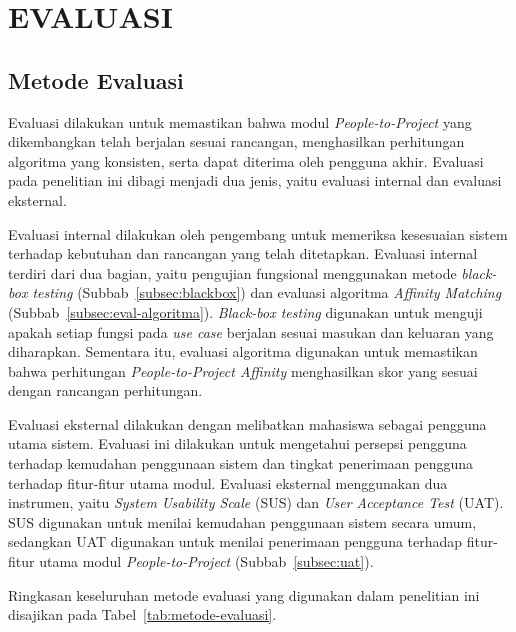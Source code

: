 \cleardoublepage
\chapter{EVALUASI}
\label{chap:evaluasi}

\section{Metode Evaluasi}

Evaluasi dilakukan untuk memastikan bahwa modul \emph{People-to-Project} yang dikembangkan telah berjalan sesuai rancangan, menghasilkan perhitungan algoritma yang konsisten, serta dapat diterima oleh pengguna akhir. Evaluasi pada penelitian ini dibagi menjadi dua jenis, yaitu evaluasi internal dan evaluasi eksternal.

Evaluasi internal dilakukan oleh pengembang untuk memeriksa kesesuaian sistem terhadap kebutuhan dan rancangan yang telah ditetapkan. Evaluasi internal terdiri dari dua bagian, yaitu pengujian fungsional menggunakan metode \emph{black-box testing} (Subbab~\ref{subsec:blackbox}) dan evaluasi algoritma \emph{Affinity Matching} (Subbab~\ref{subsec:eval-algoritma}). \emph{Black-box testing} digunakan untuk menguji apakah setiap fungsi pada \emph{use case} berjalan sesuai masukan dan keluaran yang diharapkan. Sementara itu, evaluasi algoritma digunakan untuk memastikan bahwa perhitungan \emph{People-to-Project Affinity} menghasilkan skor yang sesuai dengan rancangan perhitungan.

Evaluasi eksternal dilakukan dengan melibatkan mahasiswa sebagai pengguna utama sistem. Evaluasi ini dilakukan untuk mengetahui persepsi pengguna terhadap kemudahan penggunaan sistem dan tingkat penerimaan pengguna terhadap fitur-fitur utama modul. Evaluasi eksternal menggunakan dua instrumen, yaitu \emph{System Usability Scale} (SUS) dan \emph{User Acceptance Test} (UAT). SUS digunakan untuk menilai kemudahan penggunaan sistem secara umum, sedangkan UAT digunakan untuk menilai penerimaan pengguna terhadap fitur-fitur utama modul \emph{People-to-Project} (Subbab~\ref{subsec:uat}).

Ringkasan keseluruhan metode evaluasi yang digunakan dalam penelitian ini disajikan pada Tabel~\ref{tab:metode-evaluasi}.

